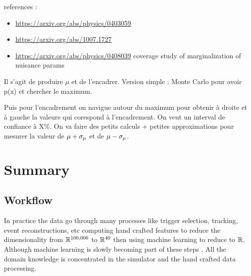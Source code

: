 references : 
\begin{itemize}
	\item \url{https://arxiv.org/abs/physics/0403059}
	\item \url{https://arxiv.org/abs/1007.1727}
	\item \url{https://arxiv.org/abs/physics/0408039} coverage study of marginalization of nuisance params
\end{itemize}




Il s'agit de produire $\mu$ et de l'encadrer.
Version simple : Monte Carlo pour avoir p(x) et chercher le maximum.

Puis pour l'encadrement on navigue autour du maximum pour obtenir à droite et à gauche la valeure qui corespond à l'encadrement.
On veut un interval de confiance à X\%.
On va faire des petits calculs + petites approximations pour mesurer la valeur de $\mu + \sigma_\mu$ et de $\mu - \sigma_\mu$.







\section{Summary} %
\label{sec:summary}


\subsection{Workflow} %
\label{sub:workflow}


In practice the data go through many processes like trigger selection, tracking, event reconstructions, etc computing hand crafted features to reduce the dimensionality from $\mathbb{R}^{100,000}$ to $\mathbb{R}^{40}$ then using machine learning to reduce to $\mathbb{R}$.
Although machine learning is slowly becoming part of these steps \needcite.
All the domain knowledge is concentrated in the simulator and the hand crafted data processing.


